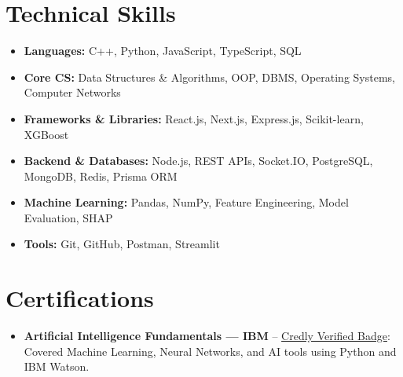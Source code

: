 \documentclass[10pt, a4paper]{article}
\begin{document}
\section{Technical Skills}
\begin{itemize}
    \item \textbf{Languages:} C++, Python, JavaScript, TypeScript, SQL
    \item \textbf{Core CS:} Data Structures \& Algorithms, OOP, DBMS, Operating Systems, Computer Networks
    \item \textbf{Frameworks \& Libraries:} React.js, Next.js, Express.js, Scikit-learn, XGBoost
    \item \textbf{Backend \& Databases:} Node.js, REST APIs, Socket.IO, PostgreSQL, MongoDB, Redis, Prisma ORM
    \item \textbf{Machine Learning:} Pandas, NumPy, Feature Engineering, Model Evaluation, SHAP
    \item \textbf{Tools:} Git, GitHub, Postman, Streamlit
\end{itemize}


\section{Certifications}
\begin{itemize}


    \item \textbf{Artificial Intelligence Fundamentals --- IBM} -- \href{https://www.credly.com/badges/ebb2dec2-164a-46b6-a8e2-e1749520465f/public_url}{Credly Verified Badge}: Covered Machine Learning, Neural Networks, and AI tools using Python and IBM Watson.


\end{itemize}
\end{document}
